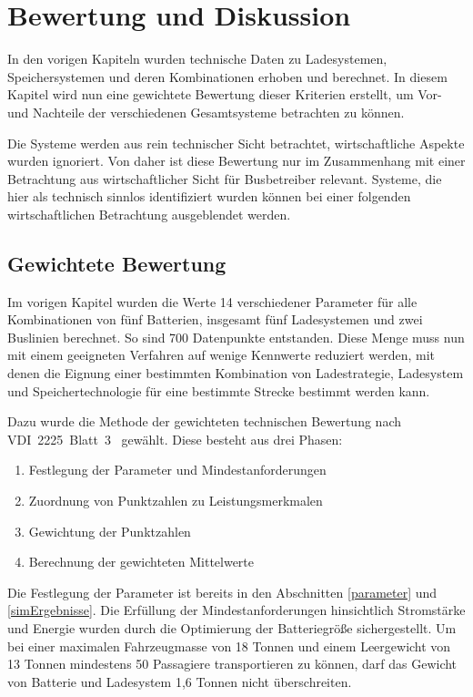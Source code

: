 \chapter{Bewertung und Diskussion} %
In den vorigen Kapiteln wurden technische Daten zu Ladesystemen, Speichersystemen und deren Kombinationen erhoben und berechnet. In diesem Kapitel wird nun eine gewichtete Bewertung dieser Kriterien erstellt, um Vor- und Nachteile der verschiedenen Gesamtsysteme betrachten zu können.

Die Systeme werden aus rein technischer Sicht betrachtet, wirtschaftliche Aspekte wurden ignoriert. Von daher ist diese Bewertung nur im Zusammenhang mit einer Betrachtung aus wirtschaftlicher Sicht für Busbetreiber relevant. Systeme, die hier als technisch sinnlos identifiziert wurden können bei einer folgenden wirtschaftlichen Betrachtung ausgeblendet werden.

\section{Gewichtete Bewertung}
Im vorigen Kapitel wurden die Werte 14 verschiedener Parameter für alle Kombinationen von fünf Batterien, insgesamt fünf Ladesystemen und zwei Buslinien berechnet. So sind 700 Datenpunkte entstanden. Diese Menge muss nun mit einem geeigneten Verfahren auf wenige Kennwerte reduziert werden, mit denen die Eignung einer bestimmten Kombination von Ladestrategie, Ladesystem und Speichertechnologie für eine bestimmte Strecke bestimmt werden kann.

Dazu wurde die Methode der gewichteten technischen Bewertung nach VDI~2225~Blatt~3~\cite{vdi:2225} gewählt. Diese besteht aus drei Phasen:
\begin{enumerate}
	\item Festlegung der Parameter und Mindestanforderungen
	\item Zuordnung von Punktzahlen zu Leistungsmerkmalen
	\item Gewichtung der Punktzahlen
	\item Berechnung der gewichteten Mittelwerte
\end{enumerate}

Die Festlegung der Parameter ist bereits in den Abschnitten \ref{parameter} und \ref{simErgebnisse}. Die Erfüllung der Mindestanforderungen hinsichtlich Stromstärke und Energie wurden durch die Optimierung der Batteriegröße sichergestellt. Um bei einer maximalen Fahrzeugmasse von 18 Tonnen und einem Leergewicht von 13 Tonnen mindestens 50 Passagiere transportieren zu können, darf das Gewicht von Batterie und Ladesystem 1,6 Tonnen nicht überschreiten.

